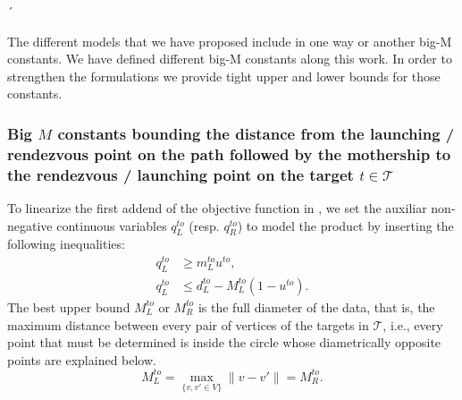 

´
\bigskip

The different models that we have proposed include in one way or another big-M constants. We have defined different big-M constants along this work. In order to strengthen the formulations we provide tight upper and lower bounds for those constants. 

\subsubsection*{Big $M$ constants bounding the distance from the launching / rendezvous point on the path followed by the mothership to the rendezvous / launching point on the target $t\in \mathcal{T}$}

To linearize the first addend of the objective function in \AMD, we set the auxiliar non-negative continuous variables $q_L^{to}$ (resp. $q_R^{to}$) to model the product by inserting the following inequalities:
\begin{align*}
q_L^{to} & \geq m_L^{to} u^{to}, \\
q_L^{to} & \leq d_L^{to} - M_L^{to}(1-u^{to}).
\end{align*}
The best upper bound $M_L^{to}$ or $M_R^{to}$ is the full diameter of the data, that is, the maximum distance between every pair of vertices of the targets in $\mathcal{T}$, i.e., every point that must be determined is inside the circle whose diametrically opposite points are explained below. 
$$
M_L^{to} = \max_{\{v, v'\in V\}} \|v - v'\| = M_R^{to}.
$$

